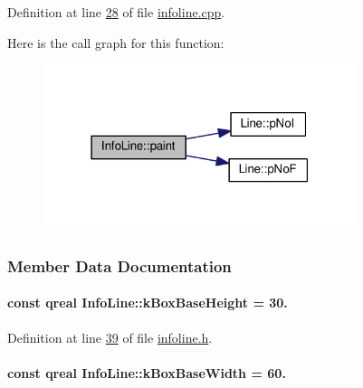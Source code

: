 Definition at line \hyperlink{infoline_8cpp_source_l00028}{28} of file \hyperlink{infoline_8cpp_source}{infoline.\+cpp}.



Here is the call graph for this function\+:
\nopagebreak
\begin{figure}[H]
\begin{center}
\leavevmode
\includegraphics[width=259pt]{class_info_line_ac696c9944716774dfe85a40ac5a434e1_cgraph}
\end{center}
\end{figure}




\subsubsection{Member Data Documentation}
\hypertarget{class_info_line_ab332e0b1c83e5ab8f551e3f39b2dfc55}{}
\paragraph[{k\+Box\+Base\+Height}]{\setlength{\rightskip}{0pt plus 5cm}const qreal Info\+Line\+::k\+Box\+Base\+Height = 30.\hspace{0.3cm}{\ttfamily [static]}}\label{class_info_line_ab332e0b1c83e5ab8f551e3f39b2dfc55}


Definition at line \hyperlink{infoline_8h_source_l00039}{39} of file \hyperlink{infoline_8h_source}{infoline.\+h}.

\hypertarget{class_info_line_a53e6553a87f670410cf66ed735f91550}{}
\paragraph[{k\+Box\+Base\+Width}]{\setlength{\rightskip}{0pt plus 5cm}const qreal Info\+Line\+::k\+Box\+Base\+Width = 60.\hspace{0.3cm}{\ttfamily [static]}}\label{class_info_line_a53e6553a87f670410cf66ed735f91550}


